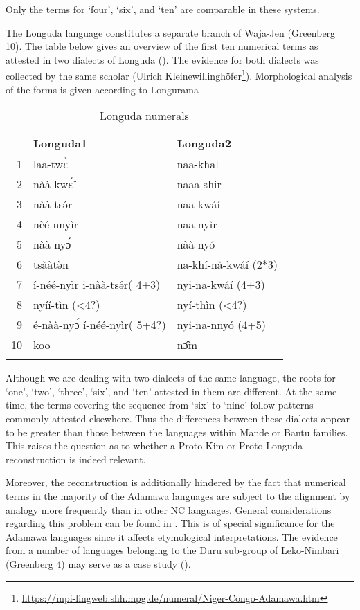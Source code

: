 Only the terms for ‘four’, ‘six’, and ‘ten’ are comparable in these systems. 

The Longuda language constitutes a separate branch of Waja-Jen (Greenberg 10). The table below gives an overview of the first ten numerical terms as attested in two dialects of Longuda (). The evidence for both dialects was collected by the same scholar (Ulrich Kleinewillinghöfer\footnote{\url{https://mpi-lingweb.shh.mpg.de/numeral/Niger-Congo-Adamawa.htm}}). Morphological analysis of the forms is given according to {{Longurama}}

\begin{table}
\caption{\label{tab:3:99}Longuda numerals}


\begin{tabularx}{\textwidth}{rXl} 
\lsptoprule
& {Longuda1} & {Longuda2}\\
\midrule
1 & laa-tw{\`{ɛ}} & naa-khal\\
2 & nàà-kw{\'{\~ɛ}} & naaa-shir\\
3 & nàà-ts{\'{ə}}r & naa-kwáí\\
4 & nèé-nnyìr & naa-nyìr\\
5 & nàà-ny{\'{ɔ}} & nàà-nyó\\
6 & tsààt{\`{ə}}n & na-khí-nà-kwáí (2*3)\\
7 & í-néé-nyìr i-nàà-ts{\'{ə}}r( 4+3) & nyi-na-kwáí (4+3)\\
8 & nyíí-tìn (<4?) & nyí-thìn (<4?)\\
9 & é-nàà-ny{\'{ɔ}} í-néé-nyìr( 5+4?) & nyi-na-nnyó (4+5)\\
10 & koo & n{\^{ɔ}}m\\
\lspbottomrule
\end{tabularx}
\end{table}

Although we are dealing with two dialects of the same language, the roots for ‘one’, ‘two’, ‘three’, ‘six’, and ‘ten’ attested in them are different. At the same time, the terms covering the sequence from ‘six’ to ‘nine’ follow patterns commonly attested elsewhere. Thus the differences between these dialects appear to be greater than those between the languages within Mande or Bantu families. This raises the question as to whether a Proto-Kim or Proto-Longuda reconstruction is indeed relevant.

Moreover, the reconstruction is additionally hindered by the fact that numerical terms in the majority of the Adamawa languages are subject to the alignment by analogy more frequently than in other NC languages. General considerations regarding this problem can be found in . This is of special significance for the Adamawa languages since it affects etymological interpretations. The evidence from a number of languages belonging to the Duru sub-group of Leko-Nimbari (Greenberg 4) may serve as a case study ().

